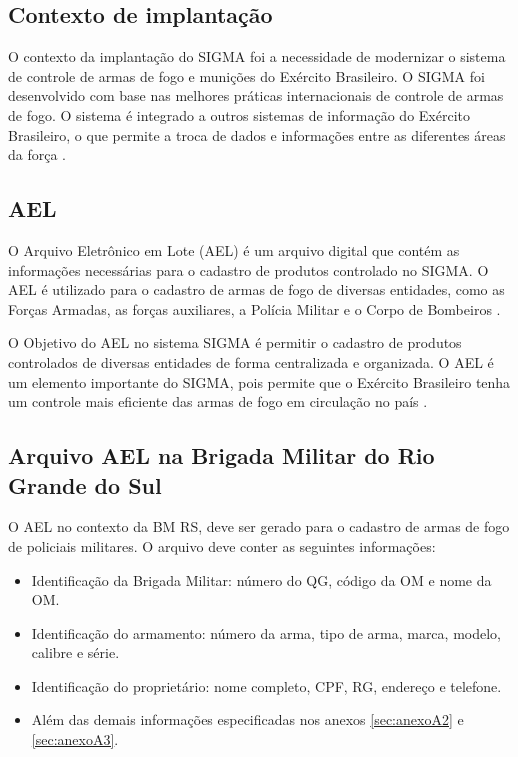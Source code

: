 \subsection{Contexto de implantação}
O contexto da implantação do SIGMA foi a necessidade de modernizar o sistema de controle de armas de fogo e munições do Exército Brasileiro.
O SIGMA foi desenvolvido com base nas melhores práticas internacionais de controle de armas de fogo. O sistema é integrado a outros sistemas de informação do Exército Brasileiro, o que permite a troca de dados e informações entre as diferentes áreas da força \cite{fenemeReunixE3oSobre}.

\subsection{AEL}
O Arquivo Eletrônico em Lote (AEL) é um arquivo digital que contém as informações necessárias para o cadastro de produtos controlado no SIGMA.
O AEL é utilizado para o cadastro de armas de fogo de diversas entidades, como as Forças Armadas, as forças auxiliares, a Polícia Militar e o Corpo de Bombeiros \cite{ExércitoBrasileiro}.

O Objetivo do AEL no sistema SIGMA é permitir o cadastro de produtos controlados de diversas entidades de forma centralizada e organizada. O AEL é um elemento importante do SIGMA, pois permite que o Exército Brasileiro tenha um controle mais eficiente das armas de fogo em circulação no país \cite{ExércitoBrasileiro}.

\subsection{Arquivo AEL na Brigada Militar do Rio Grande do Sul}
O AEL no contexto da BM RS, deve ser gerado para o cadastro de armas de fogo de policiais militares. O arquivo deve conter as seguintes informações:
\begin{itemize}
    \item Identificação da Brigada Militar: número do QG, código da OM e nome da OM.
    \item Identificação do armamento: número da arma, tipo de arma, marca, modelo, calibre e série.
    \item Identificação do proprietário: nome completo, CPF, RG, endereço e telefone.
    \item Além das demais informações especificadas nos anexos \ref{sec:anexoA2} e \ref{sec:anexoA3}.
\end{itemize}



